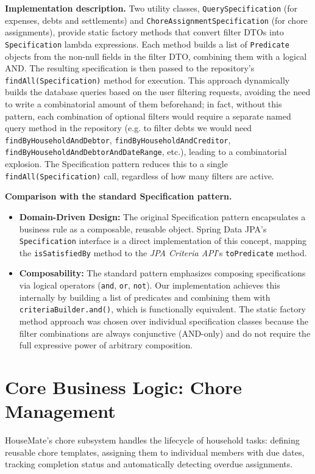 \textbf{Implementation description.} Two utility classes, \texttt{QuerySpecification} (for expenses, debts and settlements) and \texttt{ChoreAssignmentSpecification} (for chore assignments), provide static factory methods that convert filter DTOs into \texttt{Specification} lambda expressions. Each method builds a list of \texttt{Predicate} objects from the non-null fields in the filter DTO, combining them with a logical AND. The resulting specification is then passed to the repository's \texttt{findAll(Specification)} method for execution. This approach dynamically builds the database queries based on the user filtering requests, avoiding the need to write a combinatorial amount of them beforehand; in fact, without this pattern, each combination of optional filters would require a separate named query method in the repository (e.g. to filter debts we would need \texttt{findByHouseholdAndDebtor}, \texttt{findByHouseholdAndCreditor}, \\\texttt{findByHouseholdAndDebtorAndDateRange}, etc.), leading to a combinatorial explosion. The Specification pattern reduces this to a single \texttt{findAll(Specification)} call, regardless of how many filters are active.

\textbf{Comparison with the standard Specification pattern.}
\begin{itemize}
    \item \textbf{Domain-Driven Design:} The original Specification pattern encapsulates a business rule as a composable, reusable object. Spring Data JPA's\\\texttt{Specification} interface is a direct implementation of this concept, mapping the \texttt{isSatisfiedBy} method to the \textit{JPA Criteria API}'s \texttt{toPredicate} method.
    \item \textbf{Composability:} The standard pattern emphasizes composing specifications via logical operators (\texttt{and}, \texttt{or}, \texttt{not}). Our implementation achieves this internally by building a list of predicates and combining them with \texttt{criteriaBuilder.and()}, which is functionally equivalent. The static factory method approach was chosen over individual specification classes because the filter combinations are always conjunctive (AND-only) and do not require the full expressive power of arbitrary composition.
\end{itemize}

\section{Core Business Logic: Chore Management}
\label{sec:core-chore_management}
HouseMate's chore subsystem handles the lifecycle of household tasks: defining reusable chore templates, assigning them to individual members with due dates, tracking completion status and automatically detecting overdue assignments.

